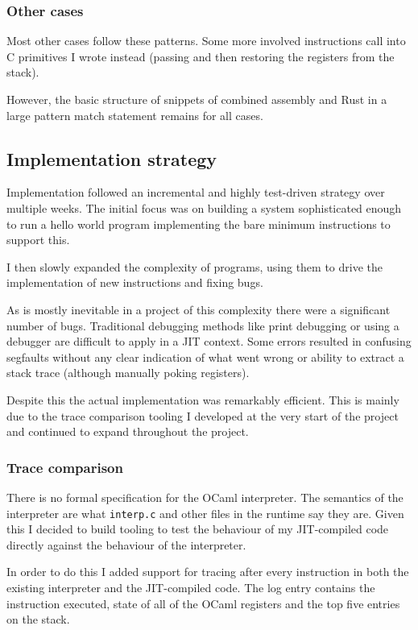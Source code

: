 \subsubsection{Other cases}

Most other cases follow these patterns. Some more involved instructions call into C primitives
I wrote instead (passing and then restoring the registers from the stack).

However, the basic structure of snippets of combined assembly and Rust in a large pattern match
statement remains for all cases.

\subsection{Implementation strategy}

Implementation followed an incremental and highly test-driven strategy over multiple weeks. The
initial focus was on building a system sophisticated enough to run a hello world program
implementing the bare minimum instructions to support this.

I then slowly expanded the complexity of programs, using them to drive the implementation of new
instructions and fixing bugs.

As is mostly inevitable in a project of this complexity there were a significant number of bugs.
Traditional debugging methods like print debugging or using a debugger are difficult to apply in
a JIT context. Some errors resulted in confusing segfaults without any clear indication of what
went
wrong or ability to extract a stack trace (although manually poking registers).

Despite this the actual implementation was remarkably efficient. This is mainly due to the trace
comparison tooling I developed at the very start of the project and continued to expand throughout
the project.

\subsubsection{Trace comparison} \label{trace-comparison}

There is no formal specification for the OCaml interpreter. The semantics of the interpreter are
what
\texttt{interp.c} and other files in the runtime say they are. Given this I decided to build
tooling to test the behaviour of my JIT-compiled code directly against the behaviour of the
interpreter.

In order to do this I added support for tracing after every instruction in both the existing
interpreter and the JIT-compiled code. The log entry contains the instruction executed, state of
all of the OCaml registers and the top five entries on the stack.

